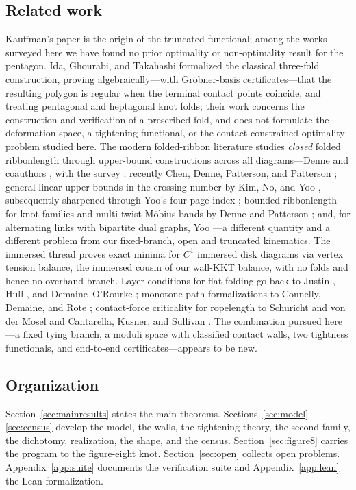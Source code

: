 \subsection{Related work}
Kauffman's paper \cite{kauffman2004} is the origin of the truncated functional; among the works surveyed here we have found no prior optimality or non-optimality result for the pentagon. Ida, Ghourabi, and Takahashi \cite{ida2015} formalized the classical three-fold construction, proving algebraically---with Gr\"obner-basis certificates---that the resulting polygon is regular when the terminal contact points coincide, and treating pentagonal and heptagonal knot folds; their work concerns the construction and verification of a prescribed fold, and does not formulate the deformation space, a tightening functional, or the contact-constrained optimality problem studied here. The modern folded-ribbon literature studies \emph{closed} folded ribbonlength through upper-bound constructions across all diagrams---Denne and coauthors \cite{denne2020}, with the survey \cite{denne2018}; recently Chen, Denne, Patterson, and Patterson \cite{chen2025}; general linear upper bounds in the crossing number by Kim, No, and Yoo \cite{kimnoyoo2026}, subsequently sharpened through Yoo's four-page index \cite{yoo2026b}; bounded ribbonlength for knot families and multi-twist M\"obius bands by Denne and Patterson \cite{dennepatterson2025}; and, for alternating links with bipartite dual graphs, Yoo \cite{yoo2026}---a different quantity and a different problem from our fixed-branch, open and truncated kinematics. The immersed thread \cite{immersed2020,ayala2025} proves exact minima for $C^1$ immersed disk diagrams via vertex tension balance, the immersed cousin of our wall-KKT balance, with no folds and hence no overhand branch. Layer conditions for flat folding go back to Justin \cite{justin1997}, Hull \cite{hull2002}, and Demaine--O'Rourke \cite{demaine2007}; monotone-path formalizations to Connelly, Demaine, and Rote \cite{cdr2003}; contact-force criticality for ropelength to Schuricht and von der Mosel \cite{svdm2004} and Cantarella, Kusner, and Sullivan \cite{cks2002}. The combination pursued here---a fixed tying branch, a moduli space with classified contact walls, two tightness functionals, and end-to-end certificates---appears to be new.

\subsection{Organization}
Section~\ref{sec:mainresults} states the main theorems. Sections~\ref{sec:model}--\ref{sec:census} develop the model, the walls, the tightening theory, the second family, the dichotomy, realization, the shape, and the census. Section~\ref{sec:figure8} carries the program to the figure-eight knot. Section~\ref{sec:open} collects open problems. Appendix~\ref{app:suite} documents the verification suite and Appendix~\ref{app:lean} the Lean formalization.

